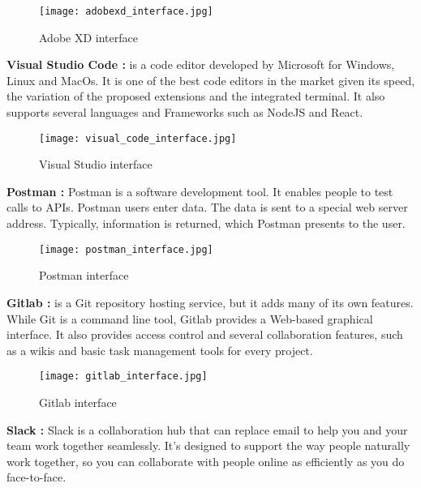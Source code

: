 \vfill
\clearpage

\begin{figure}[!ht]
    \centering
    \texttt{[image: adobexd\_interface.jpg]}
    \caption{Adobe XD interface}
    \label{fig:adobexd_interface}
\end{figure}

\hfill \break
\hfill \break
\textbf{Visual Studio Code \cite{cite7} :} is a code editor developed by Microsoft for Windows, Linux and MacOs. It is one of the best code editors in the market given its speed, the variation of the proposed extensions and the integrated terminal. It also supports several languages and Frameworks such as NodeJS and React.

\begin{figure}[!ht]
    \centering
    \texttt{[image: visual\_code\_interface.jpg]}
    \caption{Visual Studio interface}
    \label{fig:visual_code_interface}
\end{figure}

\hfill \break
\hfill \break
\textbf{Postman \cite{cite5} :} Postman is a software development tool. It enables people to test calls to APIs. Postman users enter data. The data is sent to a special web server address. Typically, information is returned, which Postman presents to the user.

\begin{figure}[!ht]
    \centering
    \texttt{[image: postman\_interface.jpg]}
    \caption{Postman interface}
    \label{fig:postman_interface}
\end{figure}


\hfill \break
\hfill \break
\textbf{Gitlab \cite{cite8} :} is a Git repository hosting service, but it adds many of its own features. While Git is a command line tool, Gitlab provides a Web-based graphical interface. It also provides access control and several collaboration features, such as a wikis and basic task management tools for every project.


\begin{figure}[!ht]
    \centering
    \texttt{[image: gitlab\_interface.jpg]}
    \caption{Gitlab interface}
    \label{fig:gitlab_interface}
\end{figure}

\vfill
\clearpage

\hfill \break
\hfill \break
\textbf{Slack \cite{cite6} :} Slack is a collaboration hub that can replace email to help you and your team work together seamlessly. It’s designed to support the way people naturally work together, so you can collaborate with people online as efficiently as you do face-to-face.

